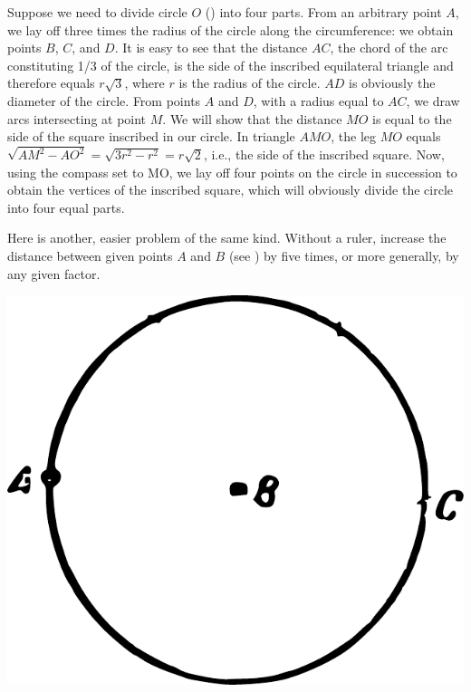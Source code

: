 \ans Suppose we need to divide circle $O$ () into four parts. From an arbitrary point $A$, we lay off three times the radius of the circle along the circumference: we obtain points $B$, $C$, and $D$. It is easy to see that the distance $AC$, the chord of the arc constituting 1/3 of the circle, is the side of the inscribed equilateral triangle and therefore equals \( r \sqrt{3} \), where \( r \) is the radius of the circle. $AD$ is obviously the diameter of the circle. From points $A$ and $D$, with a radius equal to $AC$, we draw arcs intersecting at point $M$. We will show that the distance $MO$ is equal to the side of the square inscribed in our circle. In triangle $AMO$, the leg $MO$ equals \( \sqrt{AM^{2} - AO^{2}} = \sqrt{3r^{2} - r^{2}} = r\sqrt{2} \), i.e., the side of the inscribed square. Now, using the compass set to MO, we lay off four points on the circle in succession to obtain the vertices of the inscribed square, which will obviously divide the circle into four equal parts.


\ques Here is another, easier problem of the same kind. Without a ruler, increase the distance between given points $A$ and $B$ (see ) by five times, or more generally, by any given factor.

\begin{marginfigure}%
\centering
\includegraphics[width=\textwidth]{figures/ch-10/fig-146.pdf}
\end{marginfigure}

